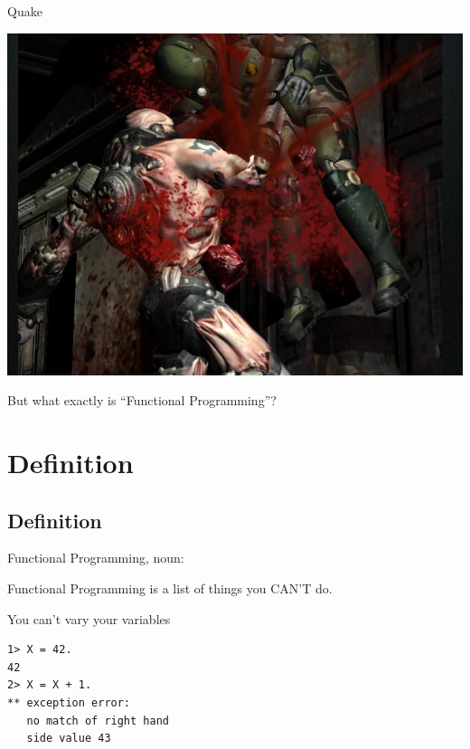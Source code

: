 \documentclass[mathserif]{beamer}
\begin{document}
\begin{frame}{Quake}
  \begin{center}
    \includegraphics[scale=0.3]{img/quake.png}
  \end{center}
\end{frame}

\begin{frame}

  \begin{center}
  {\Huge But what exactly is ``Functional Programming''?}
  \end{center}

\end{frame}

\section{Definition}
\subsection{Definition}

\begin{frame}{Functional Programming, noun:}

  \begin{exampleblock}{}
    {\Huge
      Functional Programming is a list of things you CAN’T do.
      }
    \vskip5mm
    \hspace*{}
  \end{exampleblock}
\end{frame}


\begin{frame}[fragile]{You can't vary your variables}
  \begin{verbatim}
1> X = 42.
42
2> X = X + 1.
** exception error:
   no match of right hand
   side value 43
  \end{verbatim}
\end{frame}
\end{document}
